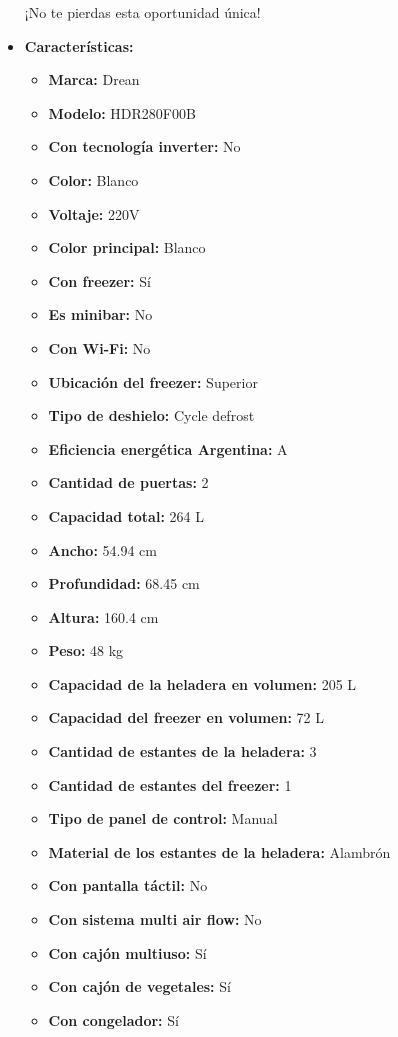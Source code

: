 \documentclass{article}
\begin{document}
\begin{adjustwidth}{2em}{}
\begin{itemize}
¡No te pierdas esta oportunidad única!
    \item \textbf{Características:} 
    \begin{itemize}
        \item \textbf {Marca:} Drean
    \item \textbf {Modelo:} HDR280F00B
    \item \textbf {Con tecnología inverter:} No
    \item \textbf {Color:} Blanco
    \item \textbf {Voltaje:} 220V
    \item \textbf {Color principal:} Blanco
    \item \textbf {Con freezer:} Sí
    \item \textbf {Es minibar:} No
    \item \textbf {Con Wi-Fi:} No
    \item \textbf {Ubicación del freezer:} Superior
    \item \textbf {Tipo de deshielo:} Cycle defrost
    \item \textbf {Eficiencia energética Argentina:} A
    \item \textbf {Cantidad de puertas:} 2
    \item \textbf {Capacidad total:} 264 L
    \item \textbf {Ancho:} 54.94 cm
    \item \textbf {Profundidad:} 68.45 cm
    \item \textbf {Altura:} 160.4 cm
    \item \textbf {Peso:} 48 kg
    \item \textbf {Capacidad de la heladera en volumen:} 205 L
    \item \textbf {Capacidad del freezer en volumen:} 72 L
    \item \textbf {Cantidad de estantes de la heladera:} 3
    \item \textbf {Cantidad de estantes del freezer:} 1
    \item \textbf {Tipo de panel de control:} Manual
    \item \textbf {Material de los estantes de la heladera:} Alambrón
    \item \textbf {Con pantalla táctil:} No
    \item \textbf {Con sistema multi air flow:} No
    \item \textbf {Con cajón multiuso:} Sí
    \item \textbf {Con cajón de vegetales:} Sí
    \item \textbf {Con congelador:} Sí

\end{itemize}
\end{itemize}
\end{adjustwidth}
\end{document}
